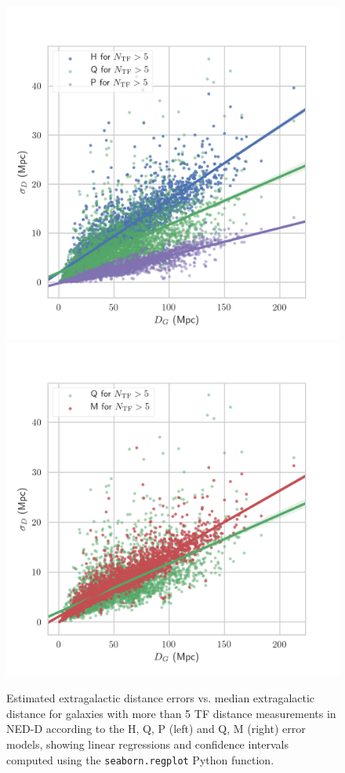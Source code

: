 \documentclass[a4paper,fleqn,usenatbib]{mnras}
\begin{document}
\begin{figure}

	\includegraphics[scale=0.69]{hqp.png}
	\includegraphics[scale=0.69]{qm.png}
    \caption{Estimated extragalactic distance errors vs. median extragalactic distance  for galaxies with more than 5 TF distance measurements in NED-D according to the H, Q, P (left) and Q, M (right) error models, showing linear regressions and confidence intervals computed using the \texttt{seaborn.regplot} Python function.}
    \label{fig:hqp-qm}
\end{figure}
\end{document}
